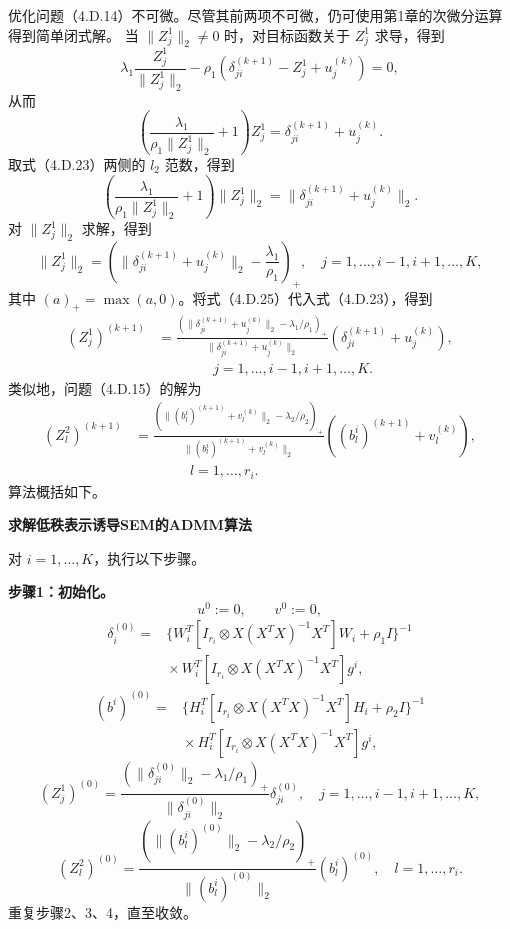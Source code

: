 优化问题（4.D.14）不可微。尽管其前两项不可微，仍可使用第1章的次微分运算得到简单闭式解。
当 $\|Z_j^1\|_2\ne0$ 时，对目标函数关于 $Z_j^1$ 求导，得到
\[
\lambda_1\frac{Z_j^1}{\|Z_j^1\|_2}
-\rho_1(\delta_{ji}^{(k+1)}-Z_j^1+u_j^{(k)})=0,
\]
从而
\begin{equation}
\left(\frac{\lambda_1}{\rho_1\|Z_j^1\|_2}+1\right)Z_j^1
=\delta_{ji}^{(k+1)}+u_j^{(k)}.\tag{4.D.23}
\end{equation}
取式（4.D.23）两侧的 $l_2$ 范数，得到
\begin{equation}
\left(\frac{\lambda_1}{\rho_1\|Z_j^1\|_2}+1\right)\|Z_j^1\|_2
=\|\delta_{ji}^{(k+1)}+u_j^{(k)}\|_2.\tag{4.D.24}
\end{equation}
对 $\|Z_j^1\|_2$ 求解，得到
\begin{equation}
\|Z_j^1\|_2=\left(\|\delta_{ji}^{(k+1)}+u_j^{(k)}\|_2-
\frac{\lambda_1}{\rho_1}\right)_+,
\quad j=1,\ldots,i-1,i+1,\ldots,K,\tag{4.D.25}
\end{equation}
其中 $(a)_+=\max(a,0)$。将式（4.D.25）代入式（4.D.23），得到
\begin{equation}
\begin{aligned}
(Z_j^1)^{(k+1)}&=
\frac{(\|\delta_{ji}^{(k+1)}+u_j^{(k)}\|_2-\lambda_1/\rho_1)_+}{
\|\delta_{ji}^{(k+1)}+u_j^{(k)}\|_2}
(\delta_{ji}^{(k+1)}+u_j^{(k)}),\\
&\hspace{4em}j=1,\ldots,i-1,i+1,\ldots,K.
\end{aligned}\tag{4.D.26}
\end{equation}
类似地，问题（4.D.15）的解为
\begin{equation}
\begin{aligned}
(Z_l^2)^{(k+1)}&=
\frac{(\|(b_l^i)^{(k+1)}+v_l^{(k)}\|_2-\lambda_2/\rho_2)_+}{
\|(b_l^i)^{(k+1)}+v_l^{(k)}\|_2}
((b_l^i)^{(k+1)}+v_l^{(k)}),\\
&\hspace{4em}l=1,\ldots,r_i.
\end{aligned}\tag{4.D.27}
\end{equation}
算法概括如下。

\par\medskip\noindent\textbf{求解低秩表示诱导SEM的ADMM算法}

对 $i=1,\ldots,K$，执行以下步骤。

\noindent\textbf{步骤1：初始化。}
\[
u^0:=0,\qquad v^0:=0,
\]
\[
\begin{aligned}
\delta_i^{(0)}={}&
\{W_i^T[I_{r_i}\otimes X(X^TX)^{-1}X^T]W_i+\rho_1I\}^{-1}\\
&{}\times W_i^T[I_{r_i}\otimes X(X^TX)^{-1}X^T]g^i,
\end{aligned}
\]
\[
\begin{aligned}
(b^i)^{(0)}={}&
\{H_i^T[I_{r_i}\otimes X(X^TX)^{-1}X^T]H_i+\rho_2I\}^{-1}\\
&{}\times H_i^T[I_{r_i}\otimes X(X^TX)^{-1}X^T]g^i,
\end{aligned}
\]
\[
(Z_j^1)^{(0)}=\frac{(\|\delta_{ji}^{(0)}\|_2-\lambda_1/\rho_1)_+}{
\|\delta_{ji}^{(0)}\|_2}\delta_{ji}^{(0)},\quad j=1,\ldots,i-1,i+1,\ldots,K,
\]
\[
(Z_l^2)^{(0)}=\frac{(\|(b_l^i)^{(0)}\|_2-\lambda_2/\rho_2)_+}{
\|(b_l^i)^{(0)}\|_2}(b_l^i)^{(0)},\quad l=1,\ldots,r_i.
\]
重复步骤2、3、4，直至收敛。


